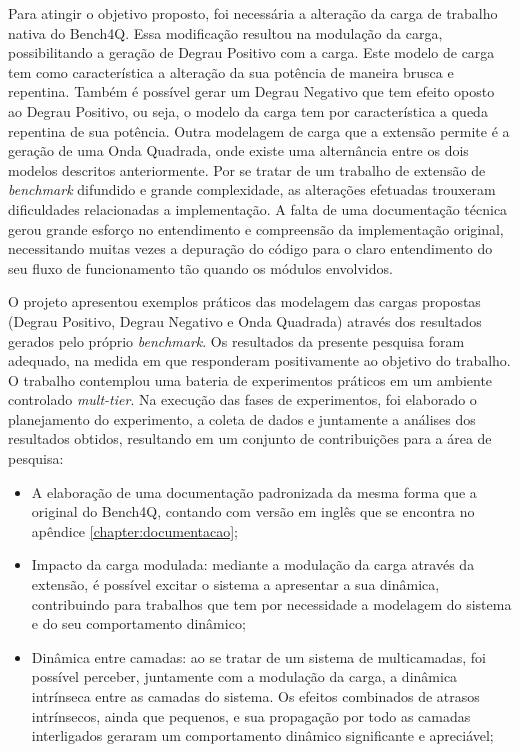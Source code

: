 Para atingir o objetivo proposto, foi necessária a alteração da carga de trabalho nativa do Bench4Q. Essa modificação resultou na modulação da carga, possibilitando a geração de Degrau Positivo com a carga. Este modelo de carga tem como característica a alteração da sua potência de maneira brusca e repentina. Também é possível gerar um Degrau Negativo que tem efeito oposto ao Degrau Positivo, ou seja, o modelo da carga tem por característica a queda repentina de sua potência. Outra modelagem de carga que a extensão permite é a geração de uma Onda Quadrada, onde existe uma alternância entre os dois modelos descritos anteriormente. 
Por se tratar de um trabalho de extensão de \textit{benchmark} difundido e grande complexidade, as alterações efetuadas trouxeram dificuldades relacionadas a implementação. A falta de uma documentação técnica gerou grande esforço no entendimento e compreensão da implementação original, necessitando muitas vezes a depuração do código para o claro entendimento do seu fluxo de funcionamento tão quando os módulos envolvidos.

O projeto apresentou exemplos práticos das modelagem das cargas propostas (Degrau Positivo, Degrau Negativo e Onda Quadrada) através dos resultados gerados pelo próprio \textit{benchmark}. Os resultados da presente pesquisa foram adequado, na medida em que responderam positivamente ao objetivo do trabalho. O trabalho contemplou uma bateria de experimentos práticos em um ambiente controlado \textit{mult-tier}. Na execução das fases de experimentos, foi elaborado o planejamento do experimento, a coleta de dados e juntamente a análises dos resultados obtidos, resultando em um conjunto de contribuições para a área de pesquisa:
\begin{itemize}
	\item A elaboração de uma documentação padronizada da mesma forma que a original do Bench4Q, contando com versão em inglês que se encontra no apêndice \ref{chapter:documentacao};
	
	\item Impacto da carga modulada: mediante a modulação da carga através da extensão, é possível excitar o sistema a apresentar a sua dinâmica, contribuindo para trabalhos que tem por necessidade a modelagem do sistema e do seu comportamento dinâmico;
	
	\item Dinâmica entre camadas: ao se tratar de um sistema de multicamadas, foi possível perceber, juntamente com a modulação da carga, a dinâmica intrínseca entre as camadas do sistema. Os efeitos combinados de atrasos intrínsecos, ainda que pequenos, e sua propagação por todo as camadas interligados geraram um comportamento dinâmico significante e apreciável;
	
\end{itemize} 

